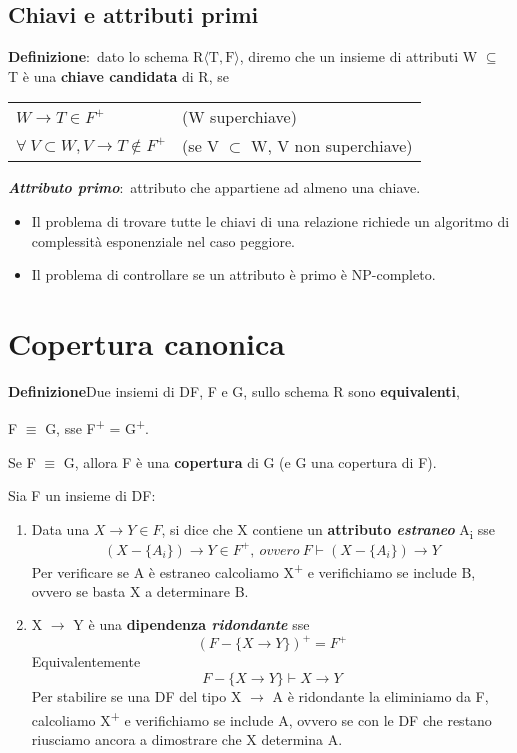\subsection{Chiavi e attributi primi}

\textbf{Definizione}:\ dato lo schema $\mathrm{R\langle T,F \rangle}$, diremo che un insieme di attributi W $\subseteq$ T è una \textbf{chiave candidata} di R, se

\begin{table}[H]
	\centering
	\begin{tabular}{l l}
		$W \rightarrow T \in F^+$                           & (W superchiave)                       \\
		$\forall\ V \subset W, V \rightarrow T \not\in F^+$ & (se V $\subset$ W, V non superchiave) \\
	\end{tabular}
\end{table}

\noindent \textbf{\textit{Attributo primo}}:\ attributo che appartiene ad almeno una chiave.

\begin{itemize}
	\item Il problema di trovare tutte le chiavi di una relazione richiede un algoritmo di complessità esponenziale nel caso peggiore.
	\item Il problema di controllare se un attributo è primo è NP-completo.
\end{itemize}

\section{Copertura canonica}

\textbf{Definizione}\quad Due insiemi di DF, F e G, sullo schema R sono \textbf{equivalenti},
\begin{center}
	F $\equiv$ G, sse F\textsuperscript{+} = G\textsuperscript{+}.\
\end{center}
Se F $\equiv$ G, allora F è una \textbf{copertura} di G (e G una copertura di F).

\begin{definition}
	Sia F un insieme di DF:
	\begin{enumerate}
		\item Data una $X \rightarrow Y \in F$, si dice che X contiene un \textbf{attributo \textit{estraneo}} A\textsubscript{i} sse
		      \[
			      (X - \{A_i\}) \rightarrow Y \in F^+,\ ovvero\ F \vdash (X - \{A_i\}) \rightarrow Y
		      \]
		      Per verificare se A è estraneo calcoliamo X\textsuperscript{+} e verifichiamo se include B, ovvero se basta X a determinare B.
		\item X $\rightarrow$ Y è una \textbf{dipendenza \textit{ridondante}} sse
		      \[ (F-\{X \rightarrow Y\})^+ = F^+ \]
		      Equivalentemente
		      \[F-\{X \rightarrow Y\} \vdash X \rightarrow Y\]
		      Per stabilire se una DF del tipo X $\rightarrow$ A è ridondante la eliminiamo da F, calcoliamo X\textsuperscript{+} e verifichiamo se include A, ovvero se con le DF che restano riusciamo ancora a dimostrare che X determina A.\
	\end{enumerate}
\end{definition}

